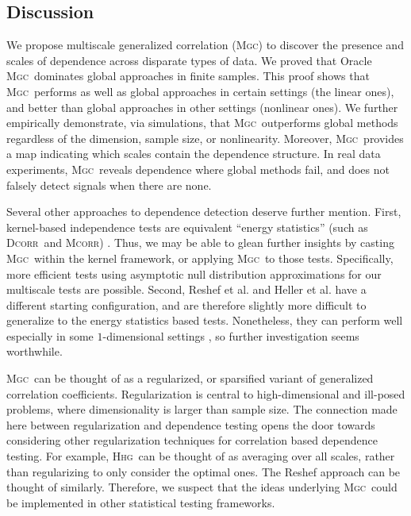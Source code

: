 \documentclass[11pt]{article}
\providecommand{\sct}[1]{{\normalfont\textsc{#1}}}
\newcommand{\Mgc}{\sct{Mgc}}
\newcommand{\Hhg}{\sct{Hhg}}
\newcommand{\Dcorr}{\sct{Dcorr}}
\newcommand{\Mcorr}{\sct{Mcorr}}
\begin{document}
\subsection*{Discussion}
\label{conclu}

We propose multiscale generalized correlation (\Mgc) to discover the presence and scales of dependence across disparate types of data.
We proved that Oracle \Mgc~dominates global approaches in finite samples.  This proof shows that \Mgc~performs as well as global approaches in certain settings (the linear ones), and better than global approaches in other settings (nonlinear ones). 
We further empirically demonstrate, via simulations, that \Mgc~outperforms global methods regardless of the dimension, sample size, or nonlinearity.  Moreover, \Mgc~provides a map indicating which scales contain the dependence structure. 
In real data experiments, \Mgc~reveals dependence where global methods fail, and does not falsely detect signals when there are none.

Several other approaches to dependence detection deserve further mention. First, kernel-based independence tests  \cite{GrettonEtAl2005, GrettonGyorfi2010, GrettonEtAl2012} are equivalent ``energy statistics'' (such as \Dcorr~and \Mcorr) \cite{SejdinovicEtAl2013, RamdasEtAl2015}. Thus, we may be able to glean further insights by casting \Mgc~within the kernel framework, or applying \Mgc~to those tests. Specifically, more efficient tests using asymptotic null distribution approximations for our multiscale tests are possible.
Second, Reshef et al. \cite{Reshef2011} and Heller et al. \cite{heller2016consistent} have a different starting configuration, and are therefore slightly more difficult to generalize to the energy statistics based tests.  Nonetheless, they can perform well especially in some $1$-dimensional settings \cite{SimonTibshirani2012, reshef2015empirical}, so further investigation seems worthwhile. 


 \Mgc~can be thought of as a regularized, or sparsified variant of generalized correlation coefficients.  Regularization is central to high-dimensional and ill-posed problems, where dimensionality is larger than sample size. The connection made here between regularization and dependence testing opens the door towards considering other regularization techniques for correlation based dependence testing. For example, \Hhg~can be thought of as averaging over all scales, rather than regularizing to only consider the optimal ones. The Reshef approach can be thought of similarly.  Therefore, we suspect that the ideas underlying \Mgc~could be implemented in other statistical testing frameworks.
\end{document}
